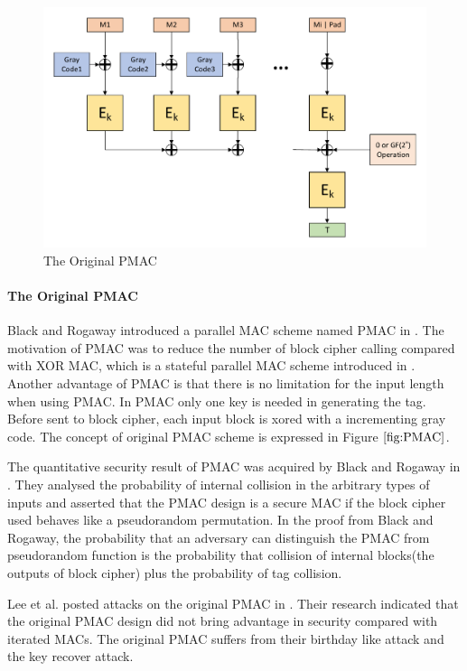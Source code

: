 \documentclass{article}
\begin{document}
\begin{figure}[htbp]
\centering
\includegraphics[scale=0.5]{./diagrams/PMAC.pdf}
\caption{The Original PMAC}
\label{fig:PMAC}
\end{figure}
\paragraph{The Original PMAC}
Black and Rogaway introduced a parallel MAC scheme named PMAC in \cite{pmac}.  
The motivation of PMAC was to reduce the number of block cipher calling compared with XOR MAC, which is a stateful parallel MAC scheme introduced in \cite{}. 
Another advantage of PMAC is that there is no limitation for the input length when using PMAC. 
In PMAC only one key is needed in generating the tag. Before sent to block cipher, each input block is xored with a incrementing gray code. The concept of original PMAC scheme is expressed in Figure $\ref{fig:PMAC}$. 

The quantitative security result of PMAC was acquired by Black and Rogaway in \cite{pmac}. They analysed the probability of internal collision in the arbitrary types of inputs and asserted that the PMAC design is a secure MAC if the block cipher used behaves like a pseudorandom permutation. In the proof from Black and Rogaway, the probability that an adversary can distinguish the PMAC from pseudorandom function is the probability that collision of internal blocks(the outputs of block cipher) plus the probability of tag collision. 

Lee et al. posted attacks on the original PMAC in \cite{pmac_forgery}. Their research indicated that the original PMAC design did not bring advantage in security compared with iterated MACs. The original PMAC suffers from their birthday like attack and the key recover attack.
\end{document}

